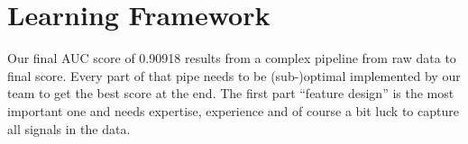\section{Learning Framework}
Our final AUC score of 0.90918 results from a complex pipeline from raw data to final score.
Every part of that pipe needs to be (sub-)optimal implemented by our team to get the best score at the end.
The first part ``feature design'' is the most important one and needs expertise, experience and of course a bit luck to capture all signals in the data.


